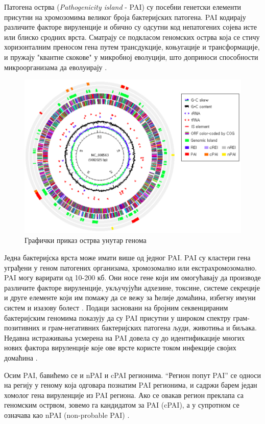 \documentclass[12pt]{article}
\begin{document}
Патогена острва (\textit{Pathogenicity island} - PAI) су посебни генетски елементи присутни на хромозомима великог броја бактеријских патогена. PAI кодирају различите факторе вируленције и обично су одсутни код непатогених сојева исте или блиско сродних врста. Сматрају се подкласом геномских острва која се стичу хоризонталним преносом гена путем трансдукције, коњугације и трансформације, и пружају "квантне скокове" у микробној еволуцији, што доприноси способности микроорганизама да еволуирају \cite{Gal-Mor2006-dv}. 

\begin{figure}[htbp]
    \centering
    \includegraphics[width=0.6\linewidth]{images/paidb.png}
    \caption{Графички приказ острва унутар генома}
    \label{fig:islands}
\end{figure}

Једна бактеријска врста може имати више од једног PAI. PAI су кластери гена уграђени у геном патогених организама, хромозомално или екстрахромозомално. PAI могу варирати од 10-200 кб. Они носе гене који им омогућавају да производе различите факторе вируленције, укључујући адхезине, токсине, системе секреције и друге елементе који им помажу да се вежу за ћелије домаћина, избегну имуни систем и изазову болест \cite{Schmidt2004-xj}. Подаци засновани на бројним секвенцираним бактеријским геномима показују да су PAI присутни у широком спектру грам-позитивних и грам-негативних бактеријских патогена људи, животиња и биљака. Недавна истраживања усмерена на PAI довела су до идентификације многих нових фактора вируленције које ове врсте користе током инфекције својих домаћина \cite{Gal-Mor2006-dv}.

Осим PAI, бавићемо се и nPAI и cPAI регионима. ``Регион попут PAI'' се односи на регију у геному која одговара познатим PAI регионима, и садржи барем један хомолог гена вируленције из PAI региона. Ако се овакав регион преклапа са геномским острвом, зовемо га кандидатом за PAI (cPAI), а у супротном се означава као nPAI (non-probable PAI) \cite{Yoon2014-xa}.
\end{document}
